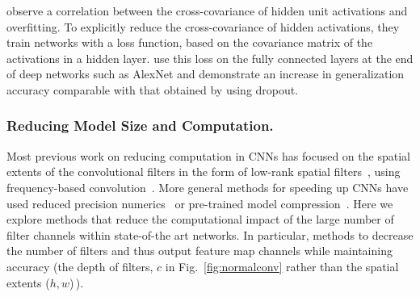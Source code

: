 \documentclass[thesis]{subfiles}
\begin{document}
	\citet{Cogswell2016} observe a correlation between the cross-covariance of hidden unit activations and overfitting. To explicitly reduce the cross-covariance of hidden activations, they train networks with a loss function, based on the covariance matrix of the activations in a hidden layer. \citet{Cogswell2016} use this loss on the fully connected layers at the end of deep networks such as AlexNet and demonstrate an increase in generalization accuracy comparable with that obtained by using dropout.
	
	
	
	\subsubsection{Reducing Model Size and Computation.}
	\label{regularizingstructure}
	Most previous work on reducing computation in CNNs has focused on the spatial extents of the convolutional filters in the form of low-rank spatial filters~\citep{mamalet2012simplifying,journals/corr/JaderbergVZ14, journals/pami/SironiTRLF15, journals/corr/LebedevGROL14, Ioannou2016}, using frequency-based convolution~\cite{mathieu2013fast,rippel2015spectral}. More general methods for speeding up CNNs have used reduced precision numerics~\cite{1502.02551v1} or pre-trained model compression~\cite{Chen2015,Kim2016}. Here we explore methods that reduce the computational impact of the large number of filter channels within state-of-the art networks. In particular, methods to decrease the number of filters and thus output feature map channels while maintaining accuracy (\ie the depth of filters, $c$ in Fig.~\ref{fig:normalconv} rather than the spatial extents ($h, w$)\,).
	
\end{document}
